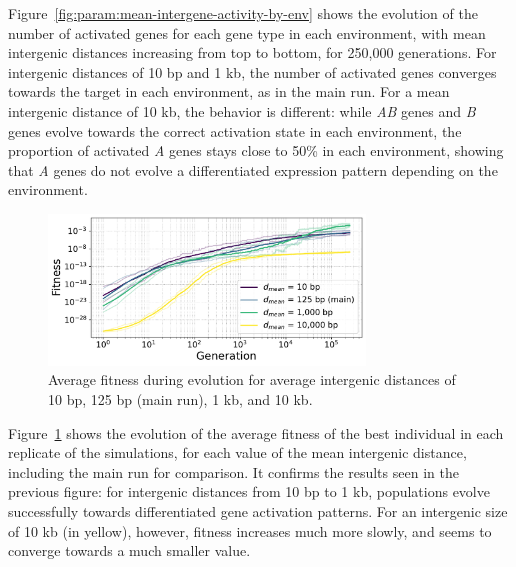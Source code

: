 Figure~\ref{fig:param:mean-intergene-activity-by-env} shows the evolution of the number of activated genes for each gene type in each environment, with mean intergenic distances increasing from top to bottom, for 250,000 generations.
For intergenic distances of 10 bp and 1 kb, the number of activated genes converges towards the target in each environment, as in the main run.
For a mean intergenic distance of 10 kb, the behavior is different: while \emph{AB} genes and \emph{B} genes evolve towards the correct activation state in each environment, the proportion of activated \emph{A} genes stays close to 50\% in each environment, showing that \emph{A} genes do not evolve a differentiated expression pattern depending on the environment.

\begin{figure}
\centering
\includegraphics[width=0.75\textwidth]{param/mean-intergene/fitness_all_with_main.pdf}
\caption[Average fitness during evolution, with increasing mean intergenic distances]{Average fitness during evolution for average intergenic distances of 10 bp, 125 bp (main run), 1 kb, and 10 kb.}
\label{fig:param:mean-intergene-fitness}
\end{figure}

Figure~\ref{fig:param:mean-intergene-fitness} shows the evolution of the average fitness of the best individual in each replicate of the simulations, for each value of the mean intergenic distance, including the main run for comparison.
It confirms the results seen in the previous figure: for intergenic distances from 10 bp to 1 kb, populations evolve successfully towards differentiated gene activation patterns.
For an intergenic size of 10 kb (in yellow), however, fitness increases much more slowly, and seems to converge towards a much smaller value.


